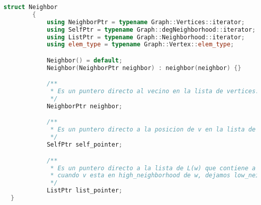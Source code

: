 \documentclass[a4paper,12pt]{article}
\begin{document}
\begin{lstlisting}[language={C++},caption={Neighbor.h},gobble=2,float=ht,label={lst:c++:graph}]
     struct Neighbor
        {
            using NeighborPtr = typename Graph::Vertices::iterator;
            using SelfPtr = typename Graph::degNeighborhood::iterator;
            using ListPtr = typename Graph::Neighborhood::iterator;
            using elem_type = typename Graph::Vertex::elem_type;

            Neighbor() = default;
            Neighbor(NeighborPtr neighbor) : neighbor(neighbor) {}

            /**
             * Es un puntero directo al vecino en la lista de vertices.
             */
            NeighborPtr neighbor;

            /**
             * Es un puntero directo a la posicion de v en la lista de N(w) que lo contiene.
             */
            SelfPtr self_pointer;

            /**
             * Es un puntero directo a la lista de L(w) que contiene a v. (Solo tiene en cuenta los low_neighborhood;
             * cuando v esta en high_neighborhood de w, dejamos low_neighborhood.end())
             */
            ListPtr list_pointer;
  }
\end{lstlisting}
\end{document}
